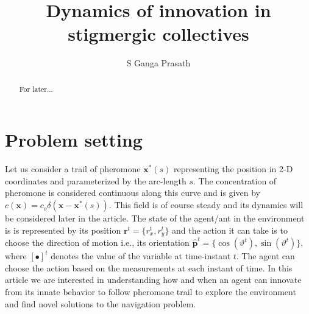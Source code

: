 \documentclass[%
reprint,
superscriptaddress,
floatfix,
amsmath,
amssymb,
aps,
notitlepage
]{revtex4-1}
\def\r{\mathbf{r}}
\def\x{\mathbf{x}}
\def\ph{\hat{\mathbf{p}}}
\def\theta{\vartheta}
\begin{document}
\title{Dynamics of innovation in stigmergic collectives}
\author{S Ganga Prasath}
\date{}

\begin{abstract}
For later...
\end{abstract}

\maketitle
\section{Problem setting}
Let us consider a trail of pheromone $\x^*(s)$ representing the position in 2-D coordinates and parameterized by the
arc-length $s$. The concentration of pheromone is considered continuous along this curve and is given by $c(\x) = c_o \delta(\x-\x^*(s))$.
This field is of course steady and its dynamics will be considered later in the article. The state of the agent/ant in
the environment is is represented by its position $\r^t=\{ r_x^t, r_y^t \}$ and the action it can take is to choose the
direction of motion i.e., its orientation $\ph^t = \{\cos(\theta^t), \sin(\theta^t)\}$, where $[\bullet]^t$ denotes the
value of the variable at time-instant $t$. The agent can choose the action based on the measurements at each instant of time.
In this article we are interested in understanding how and when an agent can innovate from its innate behavior to follow
pheromone trail to explore the environment and find novel solutions to the navigation problem. 
\end{document}
